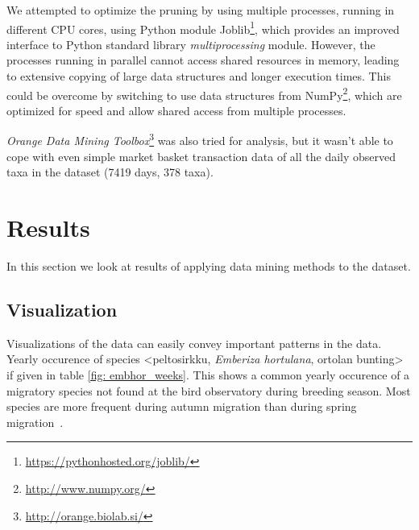 \documentclass[english]{tktltiki2}
\begin{document}
We attempted to optimize the pruning by using multiple processes, running in different CPU cores, using Python module Joblib\footnote{\url{https://pythonhosted.org/joblib/}}, which provides an improved interface to Python standard library \emph{multiprocessing} module. However, the processes running in parallel cannot access shared resources in memory, leading to extensive copying of large data structures and longer execution times. This could be overcome by switching to use data structures from NumPy\footnote{\url{http://www.numpy.org/}}, which are optimized for speed and allow shared access from multiple processes.


\emph{Orange Data Mining Toolbox}\footnote{\url{http://orange.biolab.si/}} was also tried for analysis, but it wasn't able to cope with even simple market basket transaction data of all the daily observed taxa in the dataset (7419 days, 378 taxa).


\section{Results}

In this section we look at results of applying data mining methods to the dataset.



\subsection{Visualization}

Visualizations of the data can easily convey important patterns in the data. Yearly occurence of species <peltosirkku, \emph{Emberiza hortulana}, ortolan bunting> if given in table \ref{fig: embhor_weeks}. This shows a common yearly occurence of a migratory species not found at the bird observatory during breeding season. Most species are more frequent during autumn migration than during spring migration~\cite{lehikoinen2000phenology}. %



\end{document}
